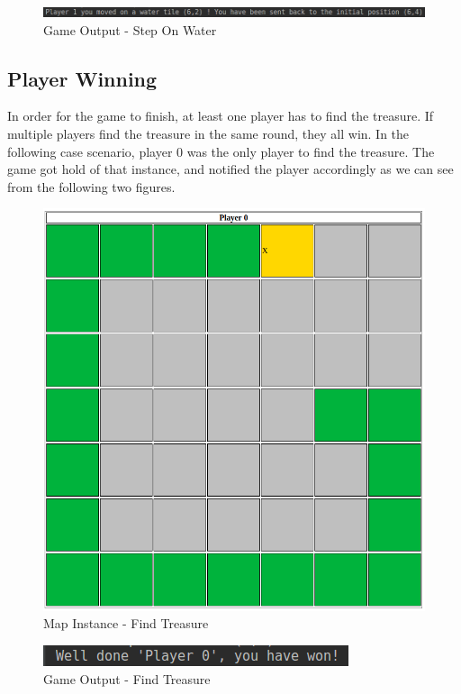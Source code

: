 \documentclass{article}
\begin{document}
    \begin{figure}[h]
        \centering
        \includegraphics[width=\linewidth]{./Images/player_1_lose.png}
        \caption{Game Output - Step On Water}
    \end{figure}

\clearpage

\subsection{Player Winning}

\noindent
In order for the game to finish, at least one player has to find the treasure. If multiple players find the treasure in the same round, they all win. In the following case scenario, player 0 was the only player to find the treasure. The game got hold of that instance, and notified the player accordingly as we can see from the following two figures.

    \begin{figure}[h]
        \centering
        \includegraphics[width=0.7\linewidth]{./Images/player_0_win_map.png}
        \caption{Map Instance - Find Treasure}
    \end{figure}

    \begin{figure}[h]
        \centering
        \includegraphics[width=0.6\linewidth]{./Images/player_0_win.png}
        \caption{Game Output - Find Treasure}
    \end{figure}
\end{document}
